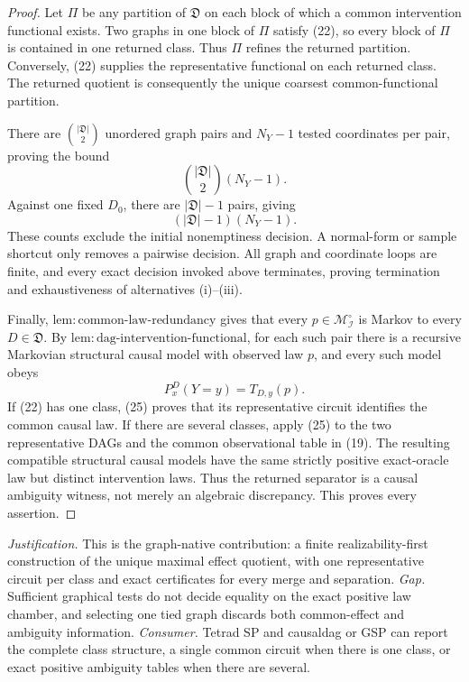 \documentclass{article}
\begin{document}
\begin{proof}
Let \(\Pi\) be any partition of \(\mathfrak D\) on each block of which a common intervention functional exists.  Two graphs in one block of \(\Pi\) satisfy (22), so every block of \(\Pi\) is contained in one returned class.  Thus \(\Pi\) refines the returned partition.  Conversely, (22) supplies the representative functional on each returned class.  The returned quotient is consequently the unique coarsest common-functional partition.

There are \(\binom{|\mathfrak D|}{2}\) unordered graph pairs and \(N_Y-1\) tested coordinates per pair, proving the bound
\[
 \binom{|\mathfrak D|}{2}(N_Y-1). \tag{23}
\]
Against one fixed \(D_0\), there are \(|\mathfrak D|-1\) pairs, giving
\[
 (|\mathfrak D|-1)(N_Y-1). \tag{24}
\]
These counts exclude the initial nonemptiness decision.  A normal-form or sample shortcut only removes a pairwise decision.  All graph and coordinate loops are finite, and every exact decision invoked above terminates, proving termination and exhaustiveness of alternatives (i)--(iii).

Finally, \(\mathrm{lem{:}common\text{-}law\text{-}redundancy}\) gives that every \(p\in\mathcal M_{\mathcal I}^{\circ}\) is Markov to every \(D\in\mathfrak D\).  By \(\mathrm{lem{:}dag\text{-}intervention\text{-}functional}\), for each such pair there is a recursive Markovian structural causal model with observed law \(p\), and every such model obeys
\[
 P_x^D(Y=y)=T_{D,y}(p). \tag{25}
\]
If (22) has one class, (25) proves that its representative circuit identifies the common causal law.  If there are several classes, apply (25) to the two representative DAGs and the common observational table in (19).  The resulting compatible structural causal models have the same strictly positive exact-oracle law but distinct intervention laws.  Thus the returned separator is a causal ambiguity witness, not merely an algebraic discrepancy.  This proves every assertion.
\end{proof}
\par\smallskip\noindent \textit{Justification.} This is the graph-native contribution: a finite realizability-first construction of the unique maximal effect quotient, with one representative circuit per class and exact certificates for every merge and separation. \textit{Gap.} Sufficient graphical tests do not decide equality on the exact positive law chamber, and selecting one tied graph discards both common-effect and ambiguity information. \textit{Consumer.} Tetrad SP and causaldag or GSP can report the complete class structure, a single common circuit when there is one class, or exact positive ambiguity tables when there are several.
\end{document}
